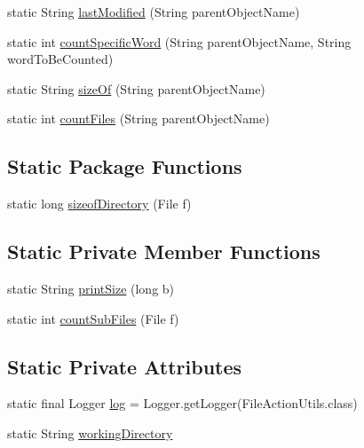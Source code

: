 \begin{DoxyCompactItemize}
\item 
static String \hyperlink{classcom_1_1poly_1_1nlp_1_1filekommander_1_1file_1_1actions_1_1_file_action_utils_a68fa55cc4deac83ac2920da1dd442172}{last\-Modified} (String parent\-Object\-Name)
\item 
static int \hyperlink{classcom_1_1poly_1_1nlp_1_1filekommander_1_1file_1_1actions_1_1_file_action_utils_a06dfce7b70b23f97847c06172ddab4b6}{count\-Specific\-Word} (String parent\-Object\-Name, String word\-To\-Be\-Counted)
\item 
static String \hyperlink{classcom_1_1poly_1_1nlp_1_1filekommander_1_1file_1_1actions_1_1_file_action_utils_a1221ebf805c2cc881c40fad828f64861}{size\-Of} (String parent\-Object\-Name)
\item 
static int \hyperlink{classcom_1_1poly_1_1nlp_1_1filekommander_1_1file_1_1actions_1_1_file_action_utils_a5159f72af191d97005ade7a8b7a95ac1}{count\-Files} (String parent\-Object\-Name)
\end{DoxyCompactItemize}
\subsection*{Static Package Functions}
\begin{DoxyCompactItemize}
\item 
static long \hyperlink{classcom_1_1poly_1_1nlp_1_1filekommander_1_1file_1_1actions_1_1_file_action_utils_a4eb94d6fbf8aed90a068180e88b8e9cd}{sizeof\-Directory} (File f)
\end{DoxyCompactItemize}
\subsection*{Static Private Member Functions}
\begin{DoxyCompactItemize}
\item 
static String \hyperlink{classcom_1_1poly_1_1nlp_1_1filekommander_1_1file_1_1actions_1_1_file_action_utils_a7c29f2257b29d8d10c39a87b351093fb}{print\-Size} (long b)
\item 
static int \hyperlink{classcom_1_1poly_1_1nlp_1_1filekommander_1_1file_1_1actions_1_1_file_action_utils_a1e5c3dca1c8116ae57515c36edeae4d9}{count\-Sub\-Files} (File f)
\end{DoxyCompactItemize}
\subsection*{Static Private Attributes}
\begin{DoxyCompactItemize}
\item 
static final Logger \hyperlink{classcom_1_1poly_1_1nlp_1_1filekommander_1_1file_1_1actions_1_1_file_action_utils_a7af6d26171248a2e7253d9bce1b287cc}{log} = Logger.\-get\-Logger(File\-Action\-Utils.\-class)
\item 
static String \hyperlink{classcom_1_1poly_1_1nlp_1_1filekommander_1_1file_1_1actions_1_1_file_action_utils_ad54a8fdc9145d2f423c54cb1597f874a}{working\-Directory}
\end{DoxyCompactItemize}


